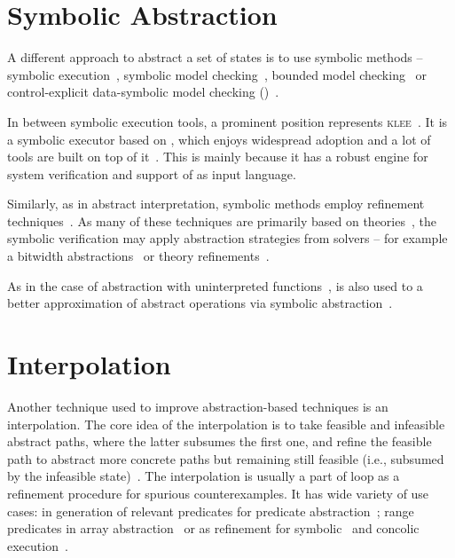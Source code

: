 \section{Symbolic Abstraction}

A different approach to abstract a set of states is to use symbolic methods --
symbolic execution~\cite{King76, Cadar2013symbolic, Baldoni2018survey}, symbolic model
checking~\cite{Clarke96, McMillan93, Cimatti20}, bounded model
checking~\cite{Biere2003bounded} or control-explicit data-symbolic model
checking (\ceds)~\cite{Mrazek2016}.

In between symbolic execution tools, a prominent position represents
\textsc{klee}~\cite{Cadar2008klee}. It is a symbolic executor based on \llvm,
which enjoys widespread adoption and a lot of tools are built on top of
it~\cite{Beyer2018Klee, Chalupa2018, Chen2018, Menezes2018}. This is mainly because it
has a robust engine for system verification and support of \llvm as input
language.

Similarly, as in abstract interpretation, symbolic methods employ refinement
techniques~\cite{Beyer2016}. As many of these techniques are primarily based on
\smt theories~\cite{Beyer2018}, the symbolic verification may apply abstraction
strategies from solvers -- for example a bitwidth
abstractions~\cite{Jonavs2018} or theory refinements~\cite{Hyvarinen2017}.

As in the case of abstraction with uninterpreted functions~\cite{Gange2016}, \smt is also used to
a better approximation of abstract operations via symbolic abstraction~\cite{Thakur2012}.


\section{Interpolation}
\label{sec:interpolation}

Another technique used to improve abstraction-based techniques is an
interpolation. The core idea of the interpolation is to take feasible and
infeasible abstract paths, where the latter subsumes the first one, and refine
the feasible path to abstract more concrete paths but remaining still feasible
(i.e., subsumed by the infeasible state)~\cite{Mcmillan2003interpolation}.  The
interpolation is usually a part of \cegar loop as a refinement procedure for
spurious counterexamples. It has wide variety of use cases: in generation of
relevant predicates for predicate abstraction~\cite{Henzinger2004abstractions,
Cimatti2016}; range predicates in array abstraction~\cite{Jhala2007array} or
as refinement for symbolic~\cite{Ibing2016} and concolic execution~\cite{Jaffar2013}.

